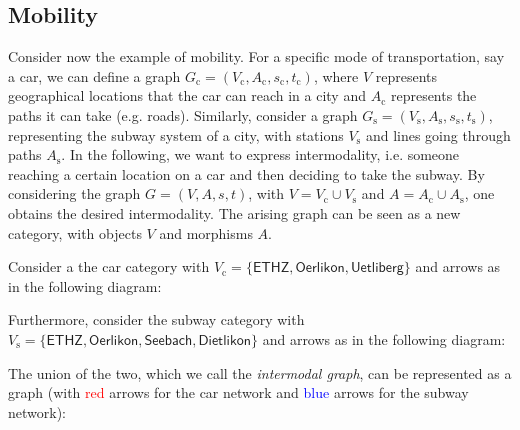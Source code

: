 \subsection{Mobility}
Consider now the example of mobility. For a specific mode of transportation, say a car, we can define a graph $G_\mathrm{c}=(V_\mathrm{c},A_\mathrm{c},s_\mathrm{c},t_\mathrm{c})$, where $V$ represents geographical locations that the car can reach in a city and $A_\mathrm{c}$ represents the paths it can take (e.g. roads). Similarly, consider a graph $G_\mathrm{s}=(V_\mathrm{s},A_\mathrm{s},s_\mathrm{s},t_\mathrm{s})$, representing the subway system of a city, with stations $V_\mathrm{s}$ and lines going through paths $A_\mathrm{s}$. In the following, we want to express intermodality, i.e. someone reaching a certain location on a car and then deciding to take the subway. By considering the graph $G=(V,A,s,t)$, with $V=V_\mathrm{c}\cup V_\mathrm{s}$ and $A=A_\mathrm{c}\cup A_\mathrm{s}$, one obtains the desired intermodality. The arising graph can be seen as a new category, with objects $V$ and morphisms $A$.
\begin{example}
Consider a the car category with $V_\mathrm{c}=\{\mathsf{ETHZ},\mathsf{Oerlikon},\mathsf{Uetliberg}\}$ and arrows as in the following diagram:
\begin{center}
\end{center}
Furthermore, consider the subway category with $V_\mathrm{s}=\{\mathsf{ETHZ},\mathsf{Oerlikon},\mathsf{Seebach},\mathsf{Dietlikon}\}$ and arrows as in the following diagram:
\begin{center}
\end{center}
The union of the two, which we call the \emph{intermodal graph}, can be represented as a graph (with \textcolor{red}{red} arrows for the car network and \textcolor{blue}{blue} arrows for the subway network):
\begin{center}
\end{center}
\end{example}
